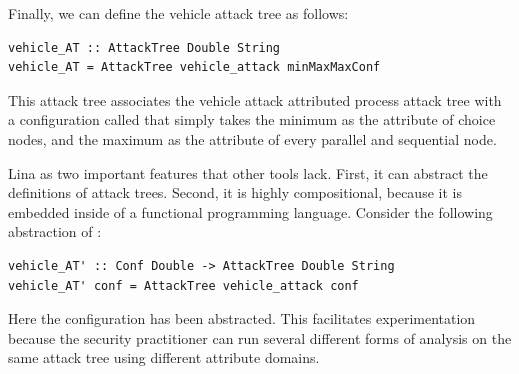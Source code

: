 \documentclass{llncs}
\begin{document}
Finally, we can define the vehicle attack tree as follows:
\begin{verbatim}
vehicle_AT :: AttackTree Double String
vehicle_AT = AttackTree vehicle_attack minMaxMaxConf
\end{verbatim}
This attack tree associates the vehicle attack attributed process
attack tree with a configuration called  that simply
takes the minimum as the attribute of choice nodes, and the maximum as
the attribute of every parallel and sequential node.

Lina as two important features that other tools lack.  First, it can
abstract the definitions of attack trees. Second, it is highly
compositional, because it is embedded inside of a functional
programming language.  Consider the following abstraction of
:
\begin{verbatim}
vehicle_AT' :: Conf Double -> AttackTree Double String
vehicle_AT' conf = AttackTree vehicle_attack conf
\end{verbatim}
Here the configuration has been abstracted.  This facilitates
experimentation because the security practitioner can run several
different forms of analysis on the same attack tree using different
attribute domains.
\end{document}
